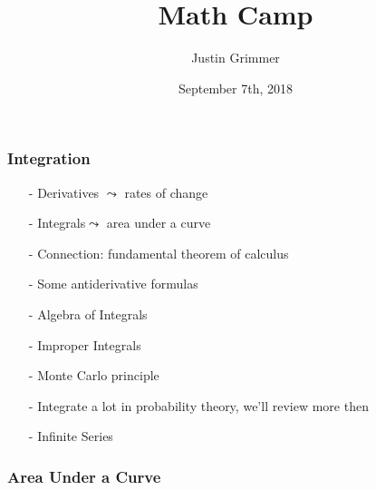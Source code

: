 \documentclass{beamer}
\title[Methodology I] %
{Math Camp}
\author{Justin Grimmer}
\institute[Stanford University]{Professor\\Department of Political Science \\ Stanford University}
\date{September 7th, 2018}
\numberwithin{equation}{section}
\begin{document}
\begin{frame}
\titlepage
\end{frame}

\begin{frame}
\frametitle{Integration}

\begin{itemize}
\item[-] \alert{Derivatives} $\leadsto$ rates of change
\item[-] \alert{Integrals}$\leadsto$ area under a curve
\item[-] \alert{Connection}: fundamental theorem of calculus
\item[-] Some \alert{antiderivative} formulas
\item[-] Algebra of Integrals
\item[-] Improper Integrals
\item[-] Monte Carlo principle
\item[-] \alert{Integrate a lot in probability theory}, we'll review more then
\item[-] Infinite Series
\end{itemize}

\end{frame}

\begin{frame}
\frametitle{Area Under a Curve}

\begin{columns}[]


\begin{itemize}
\end{itemize}


\end{columns}


\end{frame}
\end{document}
